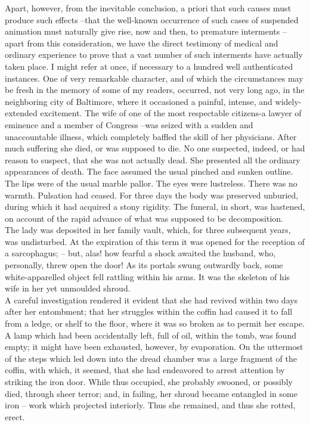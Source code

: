 \documentclass[12pt,a4paper]{article}
\begin{document}
Apart, however, from the inevitable conclusion, a priori that such causes must produce such effects --that the well-known occurrence of such cases of suspended animation must naturally give rise, now and then, to premature interments --apart from this consideration, we have the direct testimony of medical and ordinary experience to prove that a vast number of such interments have actually taken place. I might refer at once, if necessary to a hundred well authenticated instances. One of very remarkable character, and of which the circumstances may be fresh in the memory of some of my readers, occurred, not very long ago, in the neighboring city of Baltimore, where it occasioned a painful, intense, and widely-extended excitement. The wife of one of the most respectable citizens-a lawyer of eminence and a member of Congress --was seized with a sudden and unaccountable illness, which completely baffled the skill of her physicians. After much suffering she died, or was supposed to die. No one suspected, indeed, or had reason to suspect, that she was not actually dead. She presented all the ordinary appearances of death. The face assumed the usual pinched and sunken outline. The lips were of the usual marble pallor. The eyes were lustreless. There was no warmth. Pulsation had ceased. For three days the body was preserved unburied, during which it had acquired a stony rigidity. The funeral, in short, was hastened, on account of the rapid advance of what was supposed to be decomposition. \\

The lady was deposited in her family vault, which, for three subsequent years, was undisturbed. At the expiration of this term it was opened for the reception of a sarcophagus; -- but, alas! how fearful a shock awaited the husband, who, personally, threw open the door! As its portals swung outwardly back, some white-apparelled object fell rattling within his arms. It was the skeleton of his wife in her yet unmoulded shroud. \\

A careful investigation rendered it evident that she had revived within two days after her entombment; that her struggles within the coffin had caused it to fall from a ledge, or shelf to the floor, where it was so broken as to permit her escape. A lamp which had been accidentally left, full of oil, within the tomb, was found empty; it might have been exhausted, however, by evaporation. On the uttermost of the steps which led down into the dread chamber was a large fragment of the coffin, with which, it seemed, that she had endeavored to arrest attention by striking the iron door. While thus occupied, she probably swooned, or possibly died, through sheer terror; and, in failing, her shroud became entangled in some iron -- work which projected interiorly. Thus she remained, and thus she rotted, erect. \\
\end{document}
